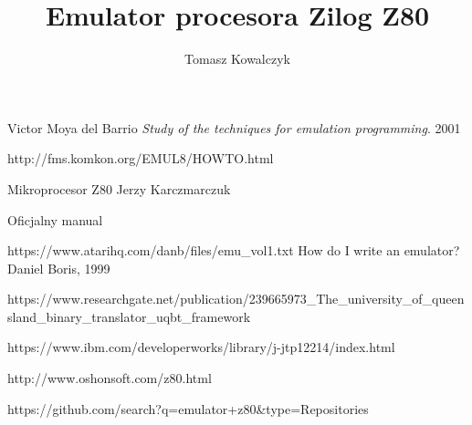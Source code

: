\documentclass[12pt]{report}
\author{Tomasz Kowalczyk}
\title{Emulator procesora Zilog Z80}
\begin{document}
	\maketitle
	\tableofcontents
	
	
	
	
	
		
		
	
	
	
	
	
	
	
	\begin{thebibliography}{9}
		Victor Moya del Barrio
		\emph{Study of the techniques for emulation programming}.
		2001
		
		http://fms.komkon.org/EMUL8/HOWTO.html
		
		Mikroprocesor Z80 Jerzy Karczmarczuk
		
		Oficjalny manual
		
		 https://www.atarihq.com/danb/files/emu\_vol1.txt
		How do I write an emulator? Daniel Boris, 1999
		
		https://www.researchgate.net/publication/239665973\_The\_university\_of\_queensland\_binary\_translator\_uqbt\_framework
		
		https://www.ibm.com/developerworks/library/j-jtp12214/index.html
		
		http://www.oshonsoft.com/z80.html
		
		https://github.com/search?q=emulator+z80\&type=Repositories
	\end{thebibliography}
	
\end{document}
